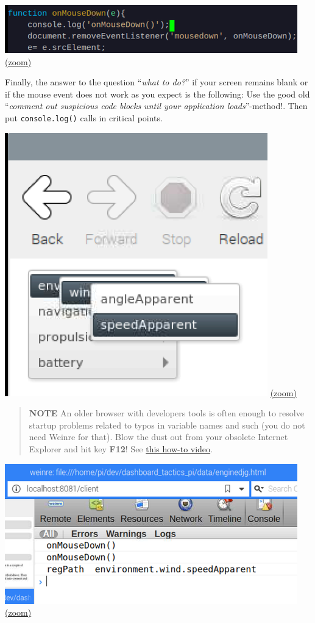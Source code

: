 \documentclass[11pt]{article}
\begin{document}
    \includegraphics{2019-12-25_weinre_server_consolelog_code.png}
\href{img/2019-12-25_weinre_server_consolelog_code.png}{(zoom)}

    Finally, the answer to the question ``\emph{what to do?}'' if your
screen remains blank or if the mouse event does not work as you expect
is the following: Use the good old ``\emph{comment out suspicious code
blocks until your application loads}''-method!. Then put
\texttt{console.log()} calls in critical points.

    \includegraphics{2019-12-25_weinre_server_console_mouse_event.png}
\href{img/2019-12-25_weinre_server_console_mouse_event.png}{(zoom)}

    \begin{quote}
\textbf{NOTE} An older browser with developers tools is often enough to
resolve startup problems related to typos in variable names and such
(you do not need Weinre for that). Blow the dust out from your obsolete
Internet Explorer and hit key \textbf{F12}! See
\href{https://vimeo.com/396195423}{this how-to video}.
\end{quote}

    \includegraphics{2019-12-25_weinre_server_console_mouse_event_log.png}
\href{img/2019-12-25_weinre_server_console_mouse_event_log.png}{(zoom)}
\end{document}
